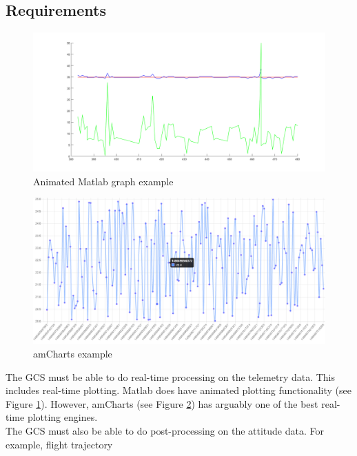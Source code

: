 \documentclass[10pt, a4paper]{article}
\begin{document}
\subsection{Requirements}

\begin{figure}
\centering
\includegraphics[scale=0.4]{anim_matlab.png}
\caption{Animated Matlab graph example}
\label{fig:matanim}
\end{figure}

\begin{figure}
\centering
\includegraphics[scale=0.28]{amCharts.png}
\caption{amCharts example}
\label{fig:amcharts}
\end{figure}

The GCS must be able to do real-time processing on the telemetry data. This includes real-time plotting. Matlab does have animated plotting functionality (see Figure \ref{fig:matanim}). However, amCharts (see Figure \ref{fig:amcharts}) has arguably one of the best real-time plotting engines.\\

The GCS must also be able to do post-processing on the attitude data. For example, flight trajectory
\end{document}
